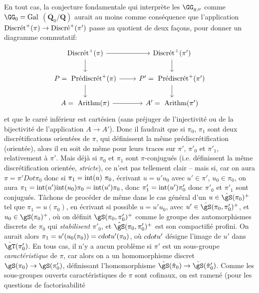 En tout cas, la conjecture fondamentale qui interprète
les $\GG_{g,\nu}$ comme $\GG_0={\rm Gal}$ $(\overline{\mathbf{Q}}_0/\mathbf{Q})$
aurait au moins comme conséquence que l'application
$\hbox {Discrét}^+(\pi)\to\hbox {Discré}^+(\pi')$
passe au quotient de deux fa\c cons, pour donner un
diagramme commutatif:
\[\begin{tikzcd}
	{\text{Discrét}^+(\pi)} & {\text{Discrét}^+(\pi')} \\
	{P =~\text{Prédiscrét}^+(\pi)} & {P' =~\text{Prédiscrét}^+(\pi')} \\
	{A =~\text{Arithm}(\pi)} & {A' =~\text{Arithm}(\pi')}
	\arrow[from=3-1, to=3-2]
	\arrow[from=2-1, to=2-2]
	\arrow[from=1-1, to=1-2]
	\arrow[from=1-2, to=2-2]
	\arrow[from=2-2, to=3-2]
	\arrow[from=2-1, to=3-1]
	\arrow[from=1-1, to=2-1]
\end{tikzcd}\]
et que le carré inférieur est cartésien (sans préjuger de
l'injectivité ou de la bijectivité de l'application
$A\to A'$).  Donc il faudrait que si $\pi_0$,
$\pi_1$ sont deux discrétifications orientées de $\pi$,
qui définissent la même prédiscrétification
(orientée), alors il en soit de même pour leurs traces 
sur $\pi'$, $\pi'_0$ et $\pi'_1$, relativement à $\pi'$.
Mais déjà si $\pi_0$ et $\pi_1$ sont $\pi$-conjugués
(i.e. définissent la même discrétification orientée,
{\it stricte}), ce n'est pas tellement clair -- mais si, car on
aura $\pi=\pi'Dot\pi_0$ donc si $\pi_1= {\rm int}(u)\ \pi_0$,
écrivant $u=u'u_0$ avec $u'\in\pi'$, $u_0\in\pi_0$, on aura
$\pi_1={\rm int}(u'){\rm int}(u_0)\pi_0={\rm int}(u')\pi_0$,
donc $\pi'_1={\rm int}(u')\pi'_0$ donc $\pi'_0$ et $\pi'_1$
sont conjugués.  T\^achons de procéder de même dans le cas
général d'un $u\in\hat\gS(\pi_0)^+$ tel que
$\pi_1=u(\pi_0)$, en écrivant si possible $u=u'u_0$,
avec $u'\in\hat\gS(\pi_0,\pi'_0)^+$, et
$u_0\in\gS(\pi_0)^+$, où on définit $\gS(\pi_0,\pi'_0)^+$
comme le groupe des automorphismes discrets de $\pi_0$
qui {\it stabilisent} $\pi'_0$, et $\hat\gS(\pi_0,\pi'_0)^+$
est son compactifié profini.  On aurait alors $\pi_1=
u'(u_0(\pi_0))=\\cdotu'(\pi_0)$, où $\\cdotu'$ désigne
l'image de $u'$ dans $\hat\gT(\pi'_0)$.  En tous cas,
il n'y a aucun problème si $\pi'$ est un sous-groupe
{\it caractéristique} de $\pi$, car alors on a un homomorphisme
discret $\gS(\pi_0)\to\gS(\pi'_0)$,
définissant l'homomorphisme 
$\hat\gS(\hat\pi_0)\to\hat\gS(\hat\pi'_0)$.  Comme les
sous-groupes ouverts caractéristiques de $\pi$ sont cofinaux,
on est ramené (pour les questions de factorisabilité
